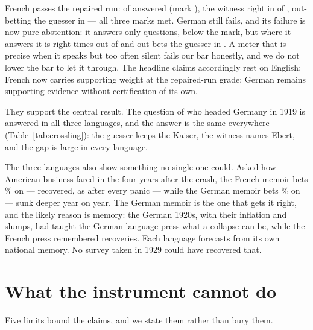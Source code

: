 \documentclass[11pt]{article}
\begin{document}
French passes the repaired run: \NFRexamAnswered{} of \NexamTotal{} answered (mark \NbarAnswer{}), the
witness right in \NFRexamCorrect{} of \NFRexamAnswered{}, out-betting the guesser in \NFRexamOutbet{} ---
all three marks met. German still fails, and its failure is now pure abstention: it answers only
\NDEexamAnswered{} questions, below the mark, but where it answers it is right \NDEexamCorrect{} times out
of \NDEexamAnswered{} and out-bets the guesser in \NDEexamOutbet{}. A meter that is precise when it speaks
but too often silent fails our bar honestly, and we do not lower the bar to let it through. The headline
claims accordingly rest on English; French now carries supporting weight at the repaired-run grade; German
remains supporting evidence without certification of its own.

They support the central result. The question of who headed Germany in 1919 is answered in all three
languages, and the answer is the same everywhere (Table~\ref{tab:crossling}): the guesser keeps the Kaiser,
the witness names Ebert, and the gap is large in every language.

\begin{table}[t]\centering\small

\caption{The flagship question in three languages. The guesser's bet on the republic, the witness's bet, and
the gap in nats. The guesser keeps a monarch in every language; the gap is the German republic's distance
from the pre-war picture, and it is large everywhere.}
\label{tab:crossling}
\end{table}

The three languages also show something no single one could. Asked how American business fared in the four
years after the crash, the French memoir bets \NdepFRp\% on \emph{\NdepFRbets} --- recovered, as after every
panic --- while the German memoir bets \NdepDEp\% on \emph{\NdepDEbets} --- sunk deeper year on year. The
German memoir is the one that gets it right, and the likely reason is memory: the German 1920s, with their
inflation and slumps, had taught the German-language press what a collapse can be, while the French press
remembered recoveries. Each language forecasts from its own national memory. No survey taken in 1929 could
have recovered that.

\section{What the instrument cannot do}\label{sec:limits}

Five limits bound the claims, and we state them rather than bury them.
\end{document}
